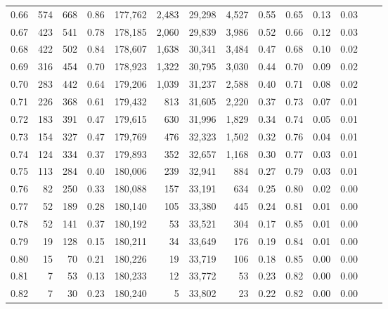 \begin{tabular}{rrrrrrrrrrrrrr}
0.66 &    574 &    668 &    0.86 &  177,762 &    2,483 &  29,298 &   4,527 &  0.55 &  0.65 &  0.13 &      0.03 \\
0.67 &    423 &    541 &    0.78 &  178,185 &    2,060 &  29,839 &   3,986 &  0.52 &  0.66 &  0.12 &      0.03 \\
0.68 &    422 &    502 &    0.84 &  178,607 &    1,638 &  30,341 &   3,484 &  0.47 &  0.68 &  0.10 &      0.02 \\
0.69 &    316 &    454 &    0.70 &  178,923 &    1,322 &  30,795 &   3,030 &  0.44 &  0.70 &  0.09 &      0.02 \\
0.70 &    283 &    442 &    0.64 &  179,206 &    1,039 &  31,237 &   2,588 &  0.40 &  0.71 &  0.08 &      0.02 \\
0.71 &    226 &    368 &    0.61 &  179,432 &      813 &  31,605 &   2,220 &  0.37 &  0.73 &  0.07 &      0.01 \\
0.72 &    183 &    391 &    0.47 &  179,615 &      630 &  31,996 &   1,829 &  0.34 &  0.74 &  0.05 &      0.01 \\
0.73 &    154 &    327 &    0.47 &  179,769 &      476 &  32,323 &   1,502 &  0.32 &  0.76 &  0.04 &      0.01 \\
0.74 &    124 &    334 &    0.37 &  179,893 &      352 &  32,657 &   1,168 &  0.30 &  0.77 &  0.03 &      0.01 \\
0.75 &    113 &    284 &    0.40 &  180,006 &      239 &  32,941 &     884 &  0.27 &  0.79 &  0.03 &      0.01 \\
0.76 &     82 &    250 &    0.33 &  180,088 &      157 &  33,191 &     634 &  0.25 &  0.80 &  0.02 &      0.00 \\
0.77 &     52 &    189 &    0.28 &  180,140 &      105 &  33,380 &     445 &  0.24 &  0.81 &  0.01 &      0.00 \\
0.78 &     52 &    141 &    0.37 &  180,192 &       53 &  33,521 &     304 &  0.17 &  0.85 &  0.01 &      0.00 \\
0.79 &     19 &    128 &    0.15 &  180,211 &       34 &  33,649 &     176 &  0.19 &  0.84 &  0.01 &      0.00 \\
0.80 &     15 &     70 &    0.21 &  180,226 &       19 &  33,719 &     106 &  0.18 &  0.85 &  0.00 &      0.00 \\
0.81 &      7 &     53 &    0.13 &  180,233 &       12 &  33,772 &      53 &  0.23 &  0.82 &  0.00 &      0.00 \\
0.82 &      7 &     30 &    0.23 &  180,240 &        5 &  33,802 &      23 &  0.22 &  0.82 &  0.00 &      0.00 \\

\end{tabular}
